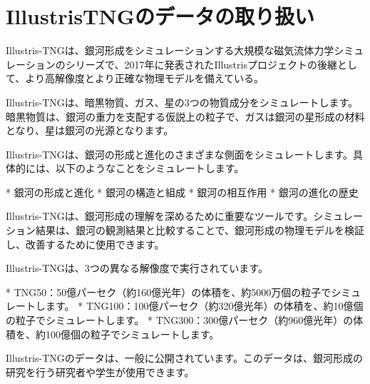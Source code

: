 \section{IllustrisTNGのデータの取り扱い}
Illustris-TNGは、銀河形成をシミュレーションする大規模な磁気流体力学シミュレーションのシリーズで、2017年に発表されたIllustrisプロジェクトの後継として、より高解像度とより正確な物理モデルを備えている。

Illustris-TNGは、暗黒物質、ガス、星の3つの物質成分をシミュレートします。暗黒物質は、銀河の重力を支配する仮説上の粒子で、ガスは銀河の星形成の材料となり、星は銀河の光源となります。

Illustris-TNGは、銀河の形成と進化のさまざまな側面をシミュレートします。具体的には、以下のようなことをシミュレートします。

* 銀河の形成と進化
* 銀河の構造と組成
* 銀河の相互作用
* 銀河の進化の歴史

Illustris-TNGは、銀河形成の理解を深めるために重要なツールです。シミュレーション結果は、銀河の観測結果と比較することで、銀河形成の物理モデルを検証し、改善するために使用できます。

Illustris-TNGは、3つの異なる解像度で実行されています。

* TNG50：50億パーセク（約160億光年）の体積を、約5000万個の粒子でシミュレートします。
* TNG100：100億パーセク（約320億光年）の体積を、約10億個の粒子でシミュレートします。
* TNG300：300億パーセク（約960億光年）の体積を、約100億個の粒子でシミュレートします。

Illustris-TNGのデータは、一般に公開されています。このデータは、銀河形成の研究を行う研究者や学生が使用できます。